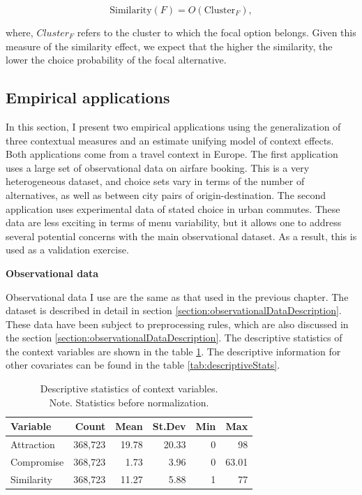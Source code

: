 \documentclass[a4paper,12pt]{article}
\begin{document}
 $$\text{Similarity}(F) = O(\text{Cluster}_F) ,
$$

where, $Cluster_F$ refers to the cluster to which the focal option belongs. Given this measure of the similarity effect, we expect that the higher the similarity, the lower the choice probability of the focal alternative.

\subsection{Empirical applications}

In this section, I present two empirical applications using the generalization of three contextual measures and an estimate unifying model of context effects. Both applications come from a travel context in Europe. The first application uses a large set of observational data on airfare booking. This is a very heterogeneous dataset, and choice sets vary in terms of the number of alternatives, as well as between city pairs of origin-destination. The second application uses experimental data of stated choice in urban commutes. These data are less exciting in terms of menu variability, but it allows one to address several potential concerns with the main observational dataset. As a result, this is used as a validation exercise. 

\textbf{Observational data}\label{section:additionalPreprocessingObservationalData}

Observational data I use are the same as that used in the previous chapter. The dataset is described in detail in section \ref{section:observationalDataDescription}. These data have been subject to preprocessing rules, which are also discussed in the section \ref{section:observationalDataDescription}. The descriptive statistics of the context variables are shown in the table \ref{tab:descriptivesContextOnly}. The descriptive information for other covariates can be found in the table \ref{tab:descriptiveStats}.

\begin{table}[ht]
\centering
\begin{tabular}{lrrrrr}
\hline
Variable & Count & Mean & St.Dev & Min & Max \\
\hline
Attraction & 368,723 & 19.78 & 20.33 & 0 & 98 \\
Compromise & 368,723 & 1.73 & 3.96 & 0 & 63.01 \\
Similarity & 368,723 & 11.27 & 5.88 & 1 & 77 \\
\hline
\end{tabular}
\caption[Descriptive statistis of context variables]{Descriptive statistics of context variables. \\ Note. Statistics before normalization.}
\label{tab:descriptivesContextOnly}
\end{table}
\end{document}
